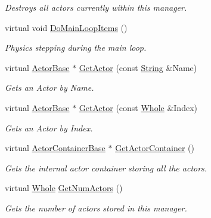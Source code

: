 \begin{DoxyCompactItemize}
\begin{DoxyCompactList}\small\item\em Destroys all actors currently within this manager. \item\end{DoxyCompactList}\item 
virtual void \hyperlink{classMezzanine_1_1ActorManager_a8b1907afd4804047c03ff4bb51c89caa}{DoMainLoopItems} ()
\begin{DoxyCompactList}\small\item\em Physics stepping during the main loop. \item\end{DoxyCompactList}\item 
virtual \hyperlink{classMezzanine_1_1ActorBase}{ActorBase} $\ast$ \hyperlink{classMezzanine_1_1ActorManager_a9657cdc7c0cef46a172ad73f366e4199}{GetActor} (const \hyperlink{namespaceMezzanine_acf9fcc130e6ebf08e3d8491aebcf1c86}{String} \&Name)
\begin{DoxyCompactList}\small\item\em Gets an Actor by Name. \item\end{DoxyCompactList}\item 
virtual \hyperlink{classMezzanine_1_1ActorBase}{ActorBase} $\ast$ \hyperlink{classMezzanine_1_1ActorManager_a71e61da8caf365ae03dd85090245b1ae}{GetActor} (const \hyperlink{namespaceMezzanine_adcbb6ce6d1eb4379d109e51171e2e493}{Whole} \&Index)
\begin{DoxyCompactList}\small\item\em Gets an Actor by Index. \item\end{DoxyCompactList}\item 
virtual \hyperlink{classMezzanine_1_1ActorContainerBase}{ActorContainerBase} $\ast$ \hyperlink{classMezzanine_1_1ActorManager_a42747650597765759b5436ee468c511c}{GetActorContainer} ()
\begin{DoxyCompactList}\small\item\em Gets the internal actor container storing all the actors. \item\end{DoxyCompactList}\item 
virtual \hyperlink{namespaceMezzanine_adcbb6ce6d1eb4379d109e51171e2e493}{Whole} \hyperlink{classMezzanine_1_1ActorManager_a92eabf039d7c8998533456da740682a8}{GetNumActors} ()
\begin{DoxyCompactList}\small\item\em Gets the number of actors stored in this manager. \item\end{DoxyCompactList}\item 

\end{DoxyCompactItemize}
